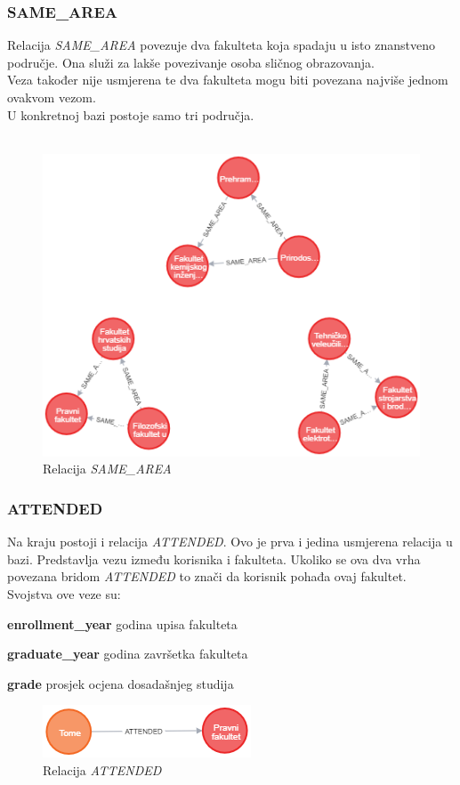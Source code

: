 \documentclass[titlepage, 12pt]{scrartcl}
\begin{document}
	\subsubsection{SAME\_AREA}
	Relacija \emph{SAME\_AREA} povezuje dva fakulteta koja spadaju u isto znanstveno područje. Ona služi za lakše povezivanje osoba sličnog obrazovanja. \\
	Veza također nije usmjerena te dva fakulteta mogu biti povezana najviše jednom ovakvom vezom. \\
	U konkretnoj bazi postoje samo tri područja.
	\\ \\
	\begin{figure}[h]
		\centering
		\includegraphics[scale=0.7]{slike/SAME_AREA.png}
		\caption{Relacija \emph{SAME\_AREA}}
		\label{fig:area}
	\end{figure}
	
	\subsubsection{ATTENDED}
	Na kraju postoji i relacija \emph{ATTENDED}. Ovo je prva i jedina usmjerena relacija u bazi. Predstavlja vezu između korisnika i fakulteta. Ukoliko se ova dva vrha povezana bridom \emph{ATTENDED} to znači da korisnik pohađa ovaj fakultet. \\
	Svojstva ove veze su:
	\begin{itemize}
	\end{itemize}
	\begin{figure}[h]
		\centering
		\includegraphics[scale=0.7]{slike/ATTENDED.png}
		\caption{Relacija \emph{ATTENDED}}
		\label{fig:attendance}
	\end{figure}
	\newpage
	
\end{document}
